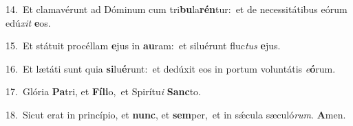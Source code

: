 {\numbfont\textcolor{\numbcolor}{14.}}~Et clamavérunt ad Dóminum cum tri\-\textbf{bu}\-la\-\textbf{rén}\-tur:~\star et de necessitátibus eórum edú\textit{xit} \textbf{e}\-os.\par
{\numbfont\textcolor{\numbcolor}{15.}}~Et státuit procéllam \textbf{e}\-jus in \textbf{au}\-ram:~\star et siluérunt fluc\textit{tus} \textbf{e}\-jus.\par
{\numbfont\textcolor{\numbcolor}{16.}}~Et lætáti sunt quia \textbf{si}\-lu\-\textbf{é}\-runt:~\star et dedúxit eos in portum voluntátis \textit{e}\-\textbf{ó}rum.\par
{\numbfont\textcolor{\numbcolor}{17.}}~Glória \textbf{Pa}\-tri, et \textbf{Fí}\-\textbf{li}o,~\star et Spirítu\textit{i} \textbf{Sanc}\-to.\par
{\numbfont\textcolor{\numbcolor}{18.}}~Sicut erat in princípio, et \textbf{nunc}\-, et \textbf{sem}\-per,~\star et in sǽcula sæculó\-\textit{rum}\-. \textbf{A}\-men.\par
